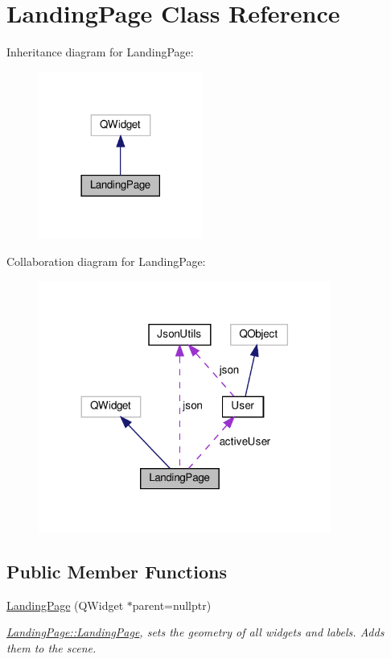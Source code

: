 \hypertarget{classLandingPage}{}\section{Landing\+Page Class Reference}
\label{classLandingPage}


Inheritance diagram for Landing\+Page\+:
\nopagebreak
\begin{figure}[H]
\begin{center}
\leavevmode
\includegraphics[width=153pt]{classLandingPage__inherit__graph}
\end{center}
\end{figure}


Collaboration diagram for Landing\+Page\+:
\nopagebreak
\begin{figure}[H]
\begin{center}
\leavevmode
\includegraphics[width=272pt]{classLandingPage__coll__graph}
\end{center}
\end{figure}
\subsection*{Public Member Functions}
\begin{DoxyCompactItemize}
\item 
\hyperlink{classLandingPage_a44edf22c689206d962cfee656b50c68c}{Landing\+Page} (Q\+Widget $\ast$parent=nullptr)
\begin{DoxyCompactList}\small\item\em \hyperlink{classLandingPage_a44edf22c689206d962cfee656b50c68c}{Landing\+Page\+::\+Landing\+Page}, sets the geometry of all widgets and labels. Adds them to the scene. \end{DoxyCompactList}\end{DoxyCompactItemize}
